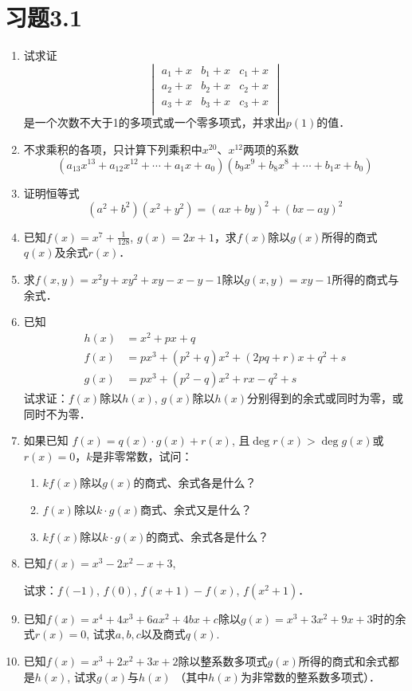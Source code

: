 \section*{习题3.1}
\begin{enumerate}
    \item 试求证
\[\begin{vmatrix}
    a_1+x &  b_1+x  &  c_1+x\\
    a_2+x &  b_2+x  &  c_2+x\\
    a_3+x &  b_3+x  &  c_3+x\\
\end{vmatrix}\]
是一个次数不大于1的多项式或一个零多项式，并求出$p(1)$的值．

\item 不求乘积的各项，只计算下列乘积中$x^{20}$、$x^{12}$两项的系数
\[(a_{13}x^{13}+a_{12}x^{12}+\cdots +a_{1}x+a_0)(b_9x^9+b_8x^8+\cdots +b_1x+b_0)\]
\item 证明恒等式
\[(a^2+b^2)(x^2+y^2)=(ax+by)^2+(bx-ay)^2\]

\item 已知$f(x)=x^7+\frac{1}{128}$, $g(x)=2x+1$，求$f(x)$除以$g(x)$所得的商式$q(x)$及余式$r(x)$．

\item 求$f(x,y)=x^2y+xy^2+xy-x-y-1$除以$g(x,y)=xy-1$所得的商式与余式．
\item 已知
\[\begin{split}
h(x)&=x^2+px+q\\
f(x)&=px^3+(p^2+q)x^2+(2pq+r)x+q^2+s\\
g(x)&=px^3+(p^2-q)x^2+rx-q^2+s
\end{split}\]
试求证：$f(x)$除以$h(x)$, $g(x)$除以$h(x)$分别得到的余式或同时为零，或同时不为零．

\item 如果已知
$f(x)=q(x)\cdot g(x)+r(x)$, 且$\deg r(x)>\deg g(x)$或$r(x)=0$，$k$是非零常数，试问：
\begin{enumerate}
    \item $kf(x)$除以$g(x)$的商式、余式各是什么？
    \item $f(x)$除以$k\cdot g(x)$商式、余式又是什么？
    \item  $kf(x)$除以$k\cdot g(x)$的商式、余式各是什么？    
\end{enumerate}


\item 已知$f(x)=x^3-2x^2-x+3$, 

试求：$f(-1)$, $f(0)$, $f (x+1) -f (x)$, $f (x^2+1)$．

\item 已知$f(x)=x^4+4x^3+6ax^2+4bx+c$除以$g(x)=x^3+3x^2+9x+3$时的余式$r(x)=0$, 试求$a,b,c$以及商式$q(x)$.

\item 已知$f(x)=x^3+2x^2+3x+2$除以整系数多项式$g(x)$所得的商式和余式都是$h(x)$, 试求$g(x)$与$h(x)$ （其中$h(x)$为非常数的整系数多项式）．
\end{enumerate}

